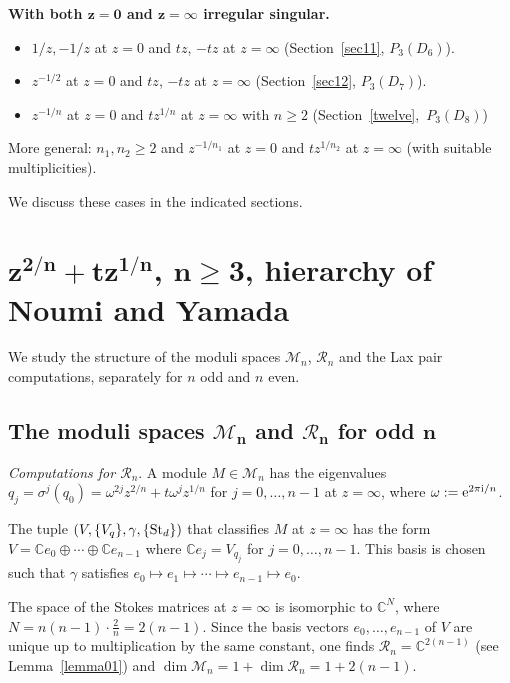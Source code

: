\documentclass[pdftex]{sigma}
\numberwithin{equation}{section}
\begin{document}
{\bf With both $\boldsymbol{z=0}$ and $\boldsymbol{z=\infty}$ irregular singular.}
\begin{itemize}\itemsep=0pt
\item $1/z,-1/z$ at $z=0$ and $tz$, $-tz$ at $z=\infty$ (Section~\ref{sec11}, $P_3(D_6)$).
\item $z^{-1/2}$ at $z=0$ and $tz$, $-tz$ at $z=\infty$ (Section~\ref{sec12}, $P_3(D_7)$).
\item $z^{-1/n}$ at $z=0$ and $tz^{1/n}$ at $z=\infty$ with $n\geq 2$ (Section~\ref{twelve},\, $P_3(D_8)$)
\end{itemize}

More general: $n_1,n_2\geq 2$ and $z^{-1/n_1}$ at $z=0$ and $tz^{1/n_2}$ at $z=\infty$
 (with suitable multiplicities).

We discuss these cases in the indicated sections.

\section[n-th root of z squared plus t times n-th root of z, hierarchy of Noumi and Yamada]{$\boldsymbol{z^{2/n}+tz^{1/n}}$, $\boldsymbol{n\geq 3}$, hierarchy of Noumi and Yamada}\label{two}
We study the structure of the moduli spaces $\mathcal{M}_n$, $\mathcal{R}_n$ and the Lax pair
computations, separately for $n$ odd and $n$ even.

\subsection[The moduli spaces M\_n and R\_n for odd n]{The moduli spaces $\boldsymbol{\mathcal{M}_n}$ and $\boldsymbol{\mathcal{R}_n}$ for odd $\boldsymbol{n}$}\label{2.1}

 {\it Computations for $\mathcal{R}_n$}.
 A module $M\in \mathcal{M}_n$ has the eigenvalues $q_j=\sigma ^j(q_0)=\omega^{2j}z^{2/n}+t\omega ^jz^{1/n}$ for $j=0,\dots ,n-1$
at $z=\infty$, where $\omega:={\rm e}^{2\pi {\rm i}/n}$.

The tuple $(V,\{V_q\},\gamma,\{{\rm St}_d\})$ that classifies $M$ at $z=\infty$
has the form $V=\mathbb{C}e_0\oplus \cdots \oplus \mathbb{C}e_{n-1}$ where $\mathbb{C}e_j=V_{q_j}$ for
$j=0,\dots , n-1$. This basis is chosen such that
 $\gamma$ satisfies $e_0\mapsto e_1\mapsto \cdots \mapsto e_{n-1}\mapsto e_0$.

 The space of the Stokes matrices at $z=\infty$ is isomorphic to $\mathbb{C}^{N}$, where $N=n(n-1)\cdot \frac{2}{n}=2(n-1)$.
 Since the basis vectors $e_0,\dots , e_{n-1}$ of $V$ are unique up to multiplication by the same constant, one finds $\mathcal{R}_n=\mathbb{C}^{2(n-1)}$ (see Lemma~\ref{lemma01}) and $\dim \mathcal{M}_n=1+\dim \mathcal{R}_n=1+2(n-1)$.
\end{document}
